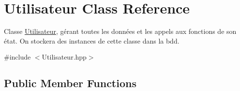\hypertarget{classUtilisateur}{\section{Utilisateur Class Reference}
\label{classUtilisateur}
}


Classe \hyperlink{classUtilisateur}{Utilisateur}, gérant toutes les données et les appels aux fonctions de son état. On stockera des instances de cette classe dans la bdd.  




{\ttfamily \#include $<$Utilisateur.\-hpp$>$}

\subsection*{Public Member Functions}
